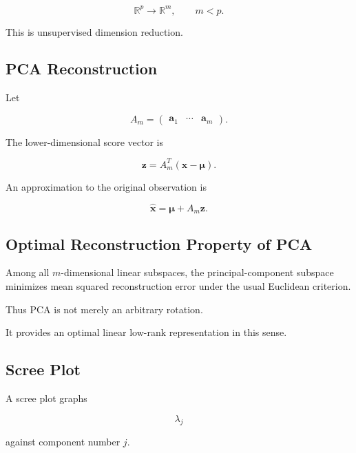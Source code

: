 \[
\boxed{
\mathbb{R}^p
\longrightarrow
\mathbb{R}^m,
\qquad
m<p.
}
\]

This is unsupervised dimension reduction.

\subsection{PCA Reconstruction}
\label{subsec:pca-reconstruction}

Let

\[
A_m
=
\begin{pmatrix}
\mathbf{a}_1&
\cdots&
\mathbf{a}_m
\end{pmatrix}.
\]

The lower-dimensional score vector is

\[
\boxed{
\mathbf{z}
=
A_m^T
(
\mathbf{x}-\boldsymbol{\mu}
).
}
\]

An approximation to the original observation is

\[
\boxed{
\widehat{\mathbf{x}}
=
\boldsymbol{\mu}
+
A_m\mathbf{z}.
}
\]

\subsection{Optimal Reconstruction Property of PCA}
\label{subsec:pca-optimal-reconstruction}

Among all \(m\)-dimensional linear subspaces, the principal-component
subspace minimizes mean squared reconstruction error under the usual
Euclidean criterion.

Thus PCA is not merely an arbitrary rotation.

It provides an optimal linear low-rank representation in this sense.

\subsection{Scree Plot}
\label{subsec:scree-plot}

A scree plot graphs

\[
\boxed{
\lambda_j
}
\]

against component number \(j\).

